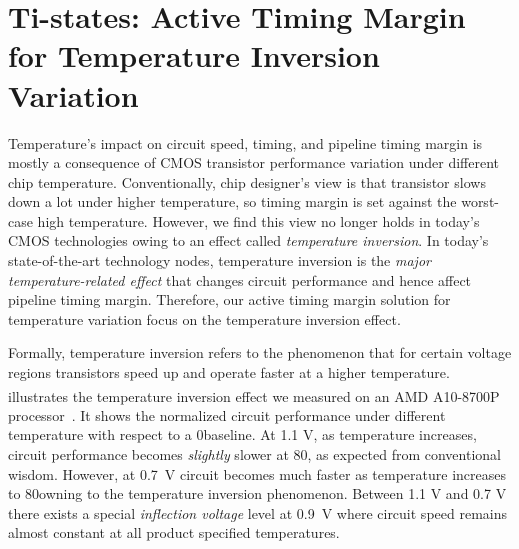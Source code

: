 
\section{Ti-states: Active Timing Margin for Temperature Inversion Variation}
\label{sec:tistate}
Temperature's impact on circuit speed, timing, and pipeline timing margin is mostly a consequence of CMOS transistor performance variation under different chip temperature. Conventionally, chip designer's view is that transistor slows down a lot under higher temperature, so timing margin is set against the worst-case high temperature. However, we find this view no longer holds in today's CMOS technologies owing to an effect called \textit{temperature inversion}. In today's state-of-the-art technology nodes, temperature inversion is the \textit{major temperature-related effect} that changes circuit performance and hence affect pipeline timing margin. Therefore, our active timing margin solution for temperature variation focus on the temperature inversion effect.

Formally, temperature inversion refers to the phenomenon that for certain voltage regions transistors speed up and operate faster at a higher temperature.  illustrates the temperature inversion effect we measured on an AMD\textsuperscript{\textregistered} A10-8700P processor~\cite{munger2016carrizo}. It shows the normalized circuit performance under different temperature with respect to a 0\C baseline. At 1.1 V, as temperature increases, circuit performance becomes \textit{slightly} slower at 80\C, as expected from conventional wisdom. However, at 0.7~V circuit becomes much faster as temperature increases to 80\C owning to the temperature inversion phenomenon. Between 1.1 V and 0.7 V there exists a special {\it inflection voltage} level at 0.9~V where circuit speed remains almost constant at all product specified temperatures. 

